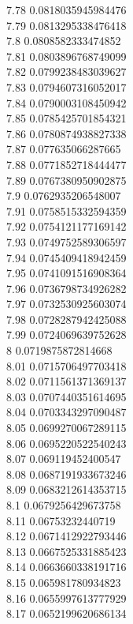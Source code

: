 {7.78	0.0818035945984476\\
7.79	0.0813295338476418\\
7.8	0.0808582333474852\\
7.81	0.0803896768749099\\
7.82	0.0799238483039627\\
7.83	0.0794607316052017\\
7.84	0.0790003108450942\\
7.85	0.0785425701854321\\
7.86	0.0780874938827338\\
7.87	0.077635066287665\\
7.88	0.0771852718444477\\
7.89	0.0767380950902875\\
7.9	0.0762935206548007\\
7.91	0.0758515332594359\\
7.92	0.0754121177169142\\
7.93	0.0749752589306597\\
7.94	0.0745409418942459\\
7.95	0.0741091516908364\\
7.96	0.0736798734926282\\
7.97	0.0732530925603074\\
7.98	0.0728287942425088\\
7.99	0.0724069639752628\\
8	0.0719875872814668\\
8.01	0.0715706497703418\\
8.02	0.0711561371369137\\
8.03	0.0707440351614695\\
8.04	0.0703343297090487\\
8.05	0.0699270067289115\\
8.06	0.0695220522540243\\
8.07	0.069119452400547\\
8.08	0.0687191933673246\\
8.09	0.0683212614353715\\
8.1	0.0679256429673758\\
8.11	0.06753232440719\\
8.12	0.0671412922793446\\
8.13	0.0667525331885423\\
8.14	0.0663660338191716\\
8.15	0.065981780934823\\
8.16	0.0655997613777929\\
8.17	0.0652199620686134\\
}
